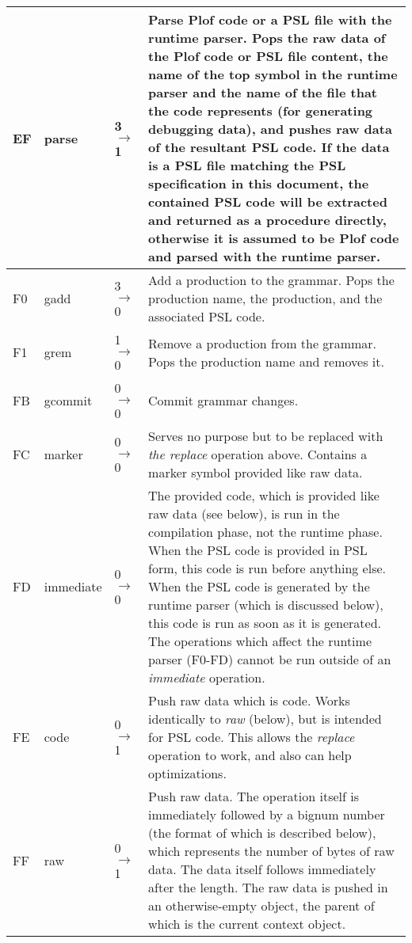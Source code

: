 \begin{longtable}{ | l | l | l | X | }
\hline
EF & parse & 3 $\rightarrow$ 1 & Parse Plof code or a PSL file with the runtime parser. Pops the raw data of the Plof code or PSL file content, the name of the top symbol in the runtime parser and the name of the file that the code represents (for generating debugging data), and pushes raw data of the resultant PSL code. If the data is a PSL file matching the PSL specification in this document, the contained PSL code will be extracted and returned as a procedure directly, otherwise it is assumed to be Plof code and parsed with the runtime parser. \\
\hline
F0 & gadd & 3 $\rightarrow$ 0 & Add a production to the grammar. Pops the production name, the production, and the associated PSL code. \\
\hline
F1 & grem & 1 $\rightarrow$ 0 & Remove a production from the grammar. Pops the production name and removes it. \\
\hline
FB & gcommit & 0 $\rightarrow$ 0 & Commit grammar changes. \\
\hline
FC & marker & 0 $\rightarrow$ 0 & Serves no purpose but to be replaced with \textit{the replace }operation above. Contains a marker symbol provided like raw data. \\
\hline
FD & immediate & 0 $\rightarrow$ 0 & The provided code, which is provided like raw data (see below), is run in the compilation phase, not the runtime phase. When the PSL code is provided in PSL form, this code is run before anything else. When the PSL code is generated by the runtime parser (which is discussed below), this code is run as soon as it is generated. The operations which affect the runtime parser (F0-FD) cannot be run outside of an \textit{immediate} operation. \\
\hline
FE & code & 0 $\rightarrow$ 1 & Push raw data which is code. Works identically to \textit{raw} (below), but is intended for PSL code. This allows the \textit{replace} operation to work, and also can help optimizations. \\
\hline
FF & raw & 0 $\rightarrow$ 1 & Push raw data. The operation itself is immediately followed by a bignum number (the format of which is described below), which represents the number of bytes of raw data. The data itself follows immediately after the length. The raw data is pushed in an otherwise-empty object, the parent of which is the current context object. \\
\hline
\end{longtable}
